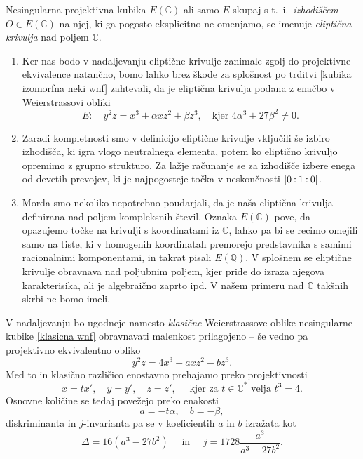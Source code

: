 \documentclass[mat1]{fmfdelo}
\numberwithin{equation}{section}
\newcommand{\C}{\mathbb C}
\newcommand{\CM}{\mathbb C ^*}
\newcommand{\Q}{\mathbb Q}
\newcommand{\pcoor}[1]{%
\begingroup\lccode`~=`: \lowercase{\endgroup
\edef~}{\mathbin{\mathchar\the\mathcode`:}\nobreak}%
\left[%
\begingroup
\mathcode`:=\string"8000
#1%
\endgroup
\right]%
}
\newcommand{\ti}{t.~i.\ }
\theoremstyle{definition}
\begin{document}
\begin{definicija}
    Nesingularna projektivna kubika $E(\C)$ ali samo $E$ skupaj s \ti \emph{izhodiščem} $O \in E(\C)$ na njej, ki ga pogosto eksplicitno ne omenjamo, se imenuje \emph{eliptična krivulja} nad poljem $\C$. 
\end{definicija}

\begin{opomba}
    \begin{enumerate}
        \item
        Ker nas bodo v nadaljevanju eliptične krivulje zanimale zgolj do projektivne ekvivalence natančno, bomo lahko brez škode za splošnost po trditvi \ref{kubika izomorfna neki wnf} zahtevali, da je eliptična krivulja podana z enačbo v Weierstrassovi obliki
        \[
            E: \quad y^2z = x^3 + \alpha x z^2 + \beta z^3,  \quad \text{kjer $4\alpha^3 + 27\beta^2 \neq 0$.}
        \]  
     
        \item 
        Zaradi kompletnosti smo v definicijo eliptične krivulje vključili še izbiro izhodišča, ki igra vlogo neutralnega elementa, potem ko eliptično krivuljo opremimo z grupno strukturo. Za lažje računanje se za izhodišče izbere enega od devetih prevojev, ki je najpogosteje točka v neskončnosti $\pcoor{0:1:0}$.  
        \item 
        Morda smo nekoliko nepotrebno poudarjali, da je naša eliptična krivulja definirana nad poljem kompleksnih števil. Oznaka $E(\C)$ pove, da opazujemo točke na krivulji s koordinatami iz $\C$, lahko pa bi se recimo omejili samo na tiste, ki v homogenih koordinatah premorejo predstavnika s samimi racionalnimi komponentami, in takrat pisali $E(\Q)$. V splošnem se eliptične krivulje obravnava nad poljubnim poljem, kjer pride do izraza njegova karakterisika, ali je algebraično zaprto ipd. V našem primeru nad $\C$ takšnih skrbi ne bomo imeli. 
    \end{enumerate}
\end{opomba}

V nadaljevanju bo ugodneje namesto \emph{klasične} Weierstrassove oblike nesingularne kubike \eqref{klasicna wnf} obravnavati malenkost prilagojeno -- še vedno pa projektivno ekvivalentno obliko
\[
    y^2z = 4x^3 - axz^2 - bz^3.  
\]
Med to in klasično različico enostavno prehajamo preko projektivnosti
\[
    x = tx', \quad y = y', \quad z = z', \quad \text{ kjer za } t \in \CM \text{ velja } t^3 = 4.   
\]
Osnovne količine se tedaj povežejo preko enakosti
\[
    a = -t\alpha, \quad b = -\beta,    
\]
diskriminanta in $j$-invarianta pa se v koeficientih $a$ in $b$ izražata kot
\begin{equation}
    \label{transformacija diskriminante in j-invariante}    
    \Delta = 16(a^3 - 27b^2) \quad \text{ in } \quad j = 1728\frac{a^3}{a^3 - 27b^2}.
\end{equation}
\end{document}
